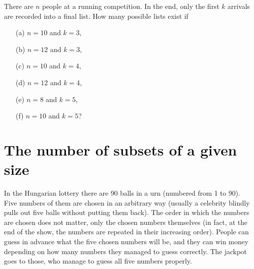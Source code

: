 \begin{exercise}\label{ex:competition}
There are $n$ people at a running competition. 
In the end, only the first $k$ arrivals are recorded into a final list. 
How many possible lists exist if
\begin{enumerate}
\item[(a)]
$n = 10$ and $k=3$, 
\item[(b)]
$n = 12$ and $k=3$, 
\item[(c)]
$n = 10$ and $k=4$, 
\item[(d)]
$n = 12$ and $k=4$, 
\item[(e)]
$n = 8$ and $k=5$, 
\item[(f)]
$n = 10$ and $k=5$? 
\end{enumerate}
\end{exercise}




\section{The number of subsets of a given size }\label{sec:nchoosek}

In the Hungarian lottery there are 90 balls in a urn (numbered from 1 to 90). 
Five numbers of them are chosen in an arbitrary way 
(usually a celebrity blindly pulls out five balls without putting them back). 
The order in which the numbers are chosen does not matter, 
only the chosen numbers themselves
(in fact, at the end of the show, 
the numbers are repeated in their increasing order).
People can guess in advance what the five chosen numbers will be, 
and they can win money depending on how many numbers they managed to guess correctly. 
The jackpot goes to those, 
who manage to guess all five numbers properly. 

